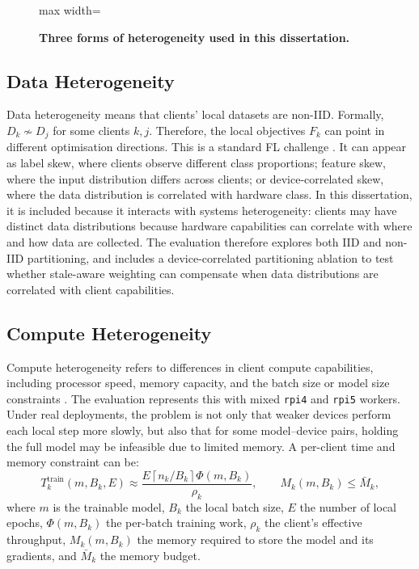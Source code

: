 \begin{figure}[H]
\begin{adjustbox}{max width=\textwidth}
\end{adjustbox}
\caption{\textbf{Three forms of heterogeneity used in this dissertation.}}
\label{fig:background_heterogeneity_forms}
\end{figure}

\subsection{Data Heterogeneity}

Data heterogeneity means that clients' local datasets are non-IID. Formally, \(D_k \not\sim D_j\) for some clients \(k,j\). Therefore, the local objectives \(F_k\) can point in different optimisation directions. This is a standard FL challenge \parencite{kairouz2021advances,wang2021field}. It can appear as label skew, where clients observe different class proportions; feature skew, where the input distribution differs across clients; or device-correlated skew, where the data distribution is correlated with hardware class. In this dissertation, it is included because it interacts with systems heterogeneity: clients may have distinct data distributions because hardware capabilities can correlate with where and how data are collected. The evaluation therefore explores both IID and non-IID partitioning, and includes a device-correlated partitioning ablation to test whether stale-aware weighting can compensate when data distributions are correlated with client capabilities.

\subsection{Compute Heterogeneity}
\label{sec:background_compute_heterogeneity}

Compute heterogeneity refers to differences in client compute capabilities, including processor speed, memory capacity, and the batch size or model size constraints \parencite{li2020fedprox,lai2022fedscale}. The evaluation represents this with mixed \texttt{rpi4} and \texttt{rpi5} workers. Under real deployments, the problem is not only that weaker devices perform each local step more slowly, but also that for some model--device pairs, holding the full model may be infeasible due to limited memory. A per-client time and memory constraint can be:
\[
    T_k^{\mathrm{train}}(m, B_k, E)
    \approx
    \frac{
      E\left\lceil n_k / B_k \right\rceil \Phi(m, B_k)
    }{\rho_k},
    \qquad
    M_k(m,B_k) \le \bar{M}_k,
\]
where \(m\) is the trainable model, \(B_k\) the local batch size, \(E\) the number of local epochs, \(\Phi(m,B_k)\) the per-batch training work, \(\rho_k\) the client's effective throughput, \(M_k(m,B_k)\) the memory required to store the model and its gradients, and \(\bar{M}_k\) the memory budget. 

